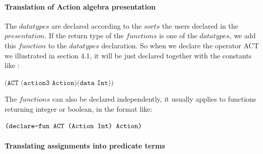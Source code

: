 \documentclass{lncs/llncs}
\newcommand{\TODO}[1]{\textcolor{red}{\textbf{[TODO:#1]}}}
\newcommand{\OTvar}{\texttt}
\begin{document}
\paragraph{Translation of Action algebra presentation}

The $datatypes$ are declared according to the $sorts$ the users
declared in the $presentation$. If the return type of the $functions$
is one of the $datatypes$, we add this $function$ to the $datatypes$ declaration.
So when we declare the operator ACT we illustrated in section 4.1, it
will be just declared together with the constants like :\\
\centerline{$\OTvar{(ACT\ (action3\ Action)(data\ Int))}$}

The $functions$ can also be declared independently, it usually applies to functions returning integer or boolean, in the format like:\\
\centerline{$\OTvar{(declare\text{-}fun\ ACT\ (Action\ Int)\ Action)}$}

%
%
%

\paragraph{Translating assignments into predicate terms}

\end{document}
